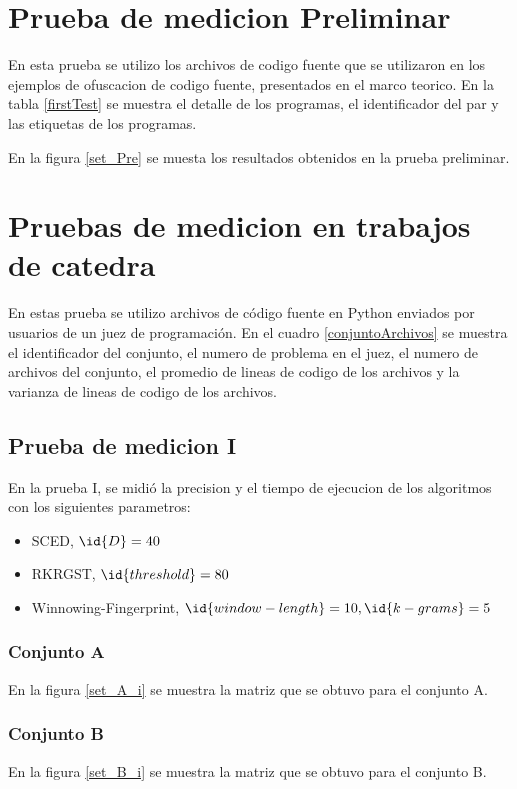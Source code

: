\section{Prueba de medicion Preliminar}
En esta prueba se utilizo los archivos de codigo fuente que se utilizaron en los ejemplos de ofuscacion de codigo fuente, presentados en el marco teorico. En la tabla \ref{firstTest} se muestra el detalle de los programas, el identificador del par y las etiquetas de los programas.



En la figura \ref{set_Pre} se muesta los resultados obtenidos en la prueba preliminar.



\section{Pruebas de medicion en trabajos de catedra}
En estas prueba se utilizo archivos de código fuente en Python enviados por usuarios de un juez de programación. En el cuadro \ref{conjuntoArchivos} se muestra el identificador del conjunto, el numero de problema en el juez, el numero de archivos del conjunto, el promedio de lineas de codigo de los archivos y la varianza de lineas de codigo de los archivos.



\subsection{Prueba de medicion I}
En la prueba I, se midió la precision y el tiempo de ejecucion de los algoritmos con los siguientes parametros:
\begin{itemize}
  \item SCED, $\id{D} = 40$
  \item RKRGST, $\id{threshold} = 80$
  \item Winnowing-Fingerprint, $\id{window-length} = 10, \id{k-grams} = 5$
\end{itemize}

\subsubsection{Conjunto A}
En la figura \ref{set_A_i} se muestra la matriz que se obtuvo para el conjunto A.


\subsubsection{Conjunto B}
En la figura \ref{set_B_i} se muestra la matriz que se obtuvo para el conjunto B.



